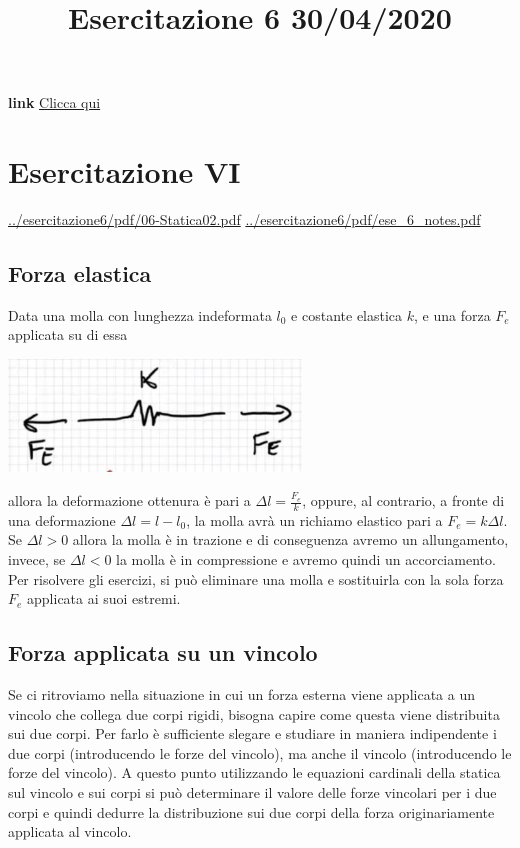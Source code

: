 \title{Esercitazione 6 30/04/2020}\newline
\textbf{link} \href{https://web.microsoftstream.com/video/e7731d3b-34c1-4fd2-a49a-606e7413fb96}{Clicca qui}
\section{Esercitazione VI}
\url{../esercitazione6/pdf/06-Statica02.pdf}\newline
\url{../esercitazione6/pdf/ese_6_notes.pdf}
\subsection{Forza elastica}
Data una molla con lunghezza indeformata $l_0$ e costante elastica $k$, e una forza $F_e$ applicata su di essa
\begin{center}
    \includegraphics[height=3cm]{../esercitazione6/img1.JPG}
\end{center}
allora la deformazione ottenura è pari a $\Delta l = \frac{F_e}{k}$, oppure, al contrario, a fronte di una deformazione $\Delta l = l - l_0$, la molla avrà un richiamo elastico pari a $F_e = k \Delta l$.\newline
\newline
Se $\Delta l > 0$ allora la molla è in trazione e di conseguenza avremo un allungamento, invece, se $\Delta l < 0$ la molla è in compressione e avremo quindi un accorciamento.\newline
\newline
Per risolvere gli esercizi, si può eliminare una molla e sostituirla con la sola forza $F_e$ applicata ai suoi estremi.
\subsection{Forza applicata su un vincolo}
Se ci ritroviamo nella situazione in cui un forza esterna viene applicata a un vincolo che collega due corpi rigidi, bisogna capire come questa viene distribuita sui due corpi.\newline
\newline
Per farlo è sufficiente slegare e studiare in maniera indipendente i due corpi (introducendo le forze del vincolo), ma anche il vincolo (introducendo le forze del vincolo). A questo punto utilizzando le equazioni cardinali della statica sul vincolo e sui corpi si può determinare il valore delle forze vincolari per i due corpi e quindi dedurre la distribuzione sui due corpi della forza originariamente applicata al vincolo.